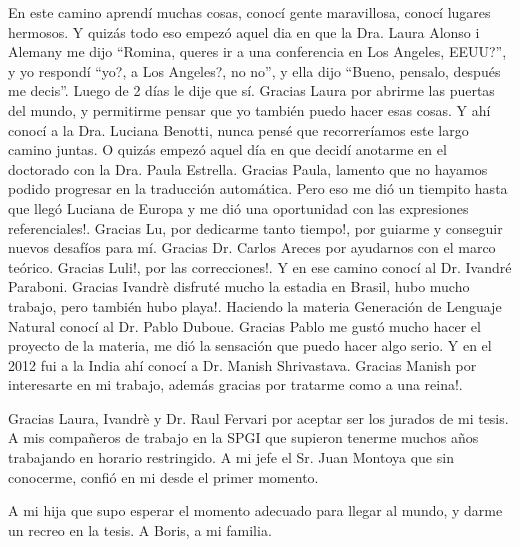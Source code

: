 
\vspace*{\fill}


En este camino aprend\'i muchas cosas, conoc\'i gente maravillosa, conoc\'i lugares hermosos. Y quiz\'as todo eso empez\'o aquel dia en que la Dra. Laura Alonso i Alemany me dijo ``Romina, queres ir a una conferencia en Los Angeles, EEUU?'', y yo respond\'i ``yo?, a Los Angeles?, no no'', y ella dijo ``Bueno, pensalo, despu\'es me decis''. Luego de 2 d\'ias le dije que s\'i. Gracias Laura por abrirme las puertas del mundo, y permitirme pensar que yo tambi\'en puedo hacer esas cosas. Y ah\'i conoc\'i a la Dra. Luciana Benotti, nunca pens\'e que recorrer\'iamos este largo camino juntas. O quiz\'as empez\'o aquel d\'ia en que decid\'i anotarme en el doctorado con la Dra. Paula Estrella. Gracias Paula, lamento que no hayamos podido progresar en la traducci\'on autom\'atica. Pero eso me di\'o un tiempito hasta que lleg\'o Luciana de Europa y me di\'o una oportunidad con las expresiones referenciales!. Gracias Lu, por dedicarme tanto tiempo!, por guiarme y conseguir nuevos desaf\'ios para m\'i. Gracias Dr. Carlos Areces por ayudarnos con el marco te\'orico. Gracias Luli!, por las correcciones!. 
Y en ese camino conoc\'i al Dr. Ivandr\'e Paraboni. Gracias Ivandr\`e disfrut\'e mucho la estadia en Brasil, hubo mucho trabajo, pero tambi\'en hubo playa!. Haciendo la materia Generaci\'on de Lenguaje Natural conoc\'i al Dr. Pablo Duboue. Gracias Pablo me gust\'o mucho hacer el proyecto de la materia, me di\'o la sensaci\'on que puedo hacer algo serio. Y en el 2012 fui a la India ah\'i conoc\'i a Dr. Manish Shrivastava. Gracias Manish por interesarte en mi trabajo, adem\'as gracias por tratarme como a una reina!. 

Gracias Laura, Ivandr\`e y Dr. Raul Fervari por aceptar ser los jurados de mi tesis.
A mis compañeros de trabajo en la SPGI que supieron tenerme muchos años trabajando en horario restringido. A mi jefe el Sr. Juan Montoya que sin conocerme, confi\'o en mi desde el primer momento.

A mi hija que supo esperar el momento adecuado para llegar al mundo, y darme un recreo en la tesis. A Boris, a mi familia. 


\vspace{\fill}
